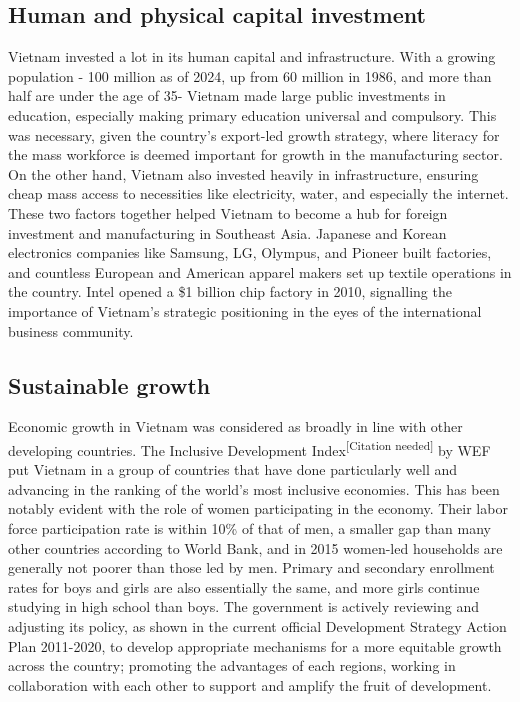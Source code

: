 \documentclass{article}
\begin{document}
\subsection*{Human and physical capital investment}
Vietnam invested a lot in its human capital and infrastructure. With a growing population - 100 million as of 2024, up from 60 million in 1986, and more than half are under the age of 35- Vietnam made large public investments in education, especially making primary education universal and compulsory. This was necessary, given the country's export-led growth strategy, where literacy for the mass workforce is deemed important for growth in the manufacturing sector. On the other hand, Vietnam also invested heavily in infrastructure, ensuring cheap mass access to necessities like electricity, water, and especially the internet. These two factors together helped Vietnam to become a hub for foreign investment and manufacturing in Southeast Asia. Japanese and Korean electronics companies like Samsung, LG, Olympus, and Pioneer built factories, and countless European and American apparel makers set up textile operations in the country. Intel opened a \$1 billion chip factory in 2010, signalling the importance of Vietnam's strategic positioning in the eyes of the international business community.

\subsection*{Sustainable growth}
Economic growth in Vietnam was considered as broadly in line with other developing countries. The Inclusive Development Index\textsuperscript{[Citation needed]} by WEF put Vietnam in a group of countries that have done particularly well and advancing in the ranking of the world's most inclusive economies. This has been notably evident with the role of women participating in the economy. Their labor force participation rate is within 10\% of that of men, a smaller gap than many other countries according to World Bank, and in 2015 women-led households are generally not poorer than those led by men. Primary and secondary enrollment rates for boys and girls are also essentially the same, and more girls continue studying in high school than boys. The government is actively reviewing and adjusting its policy, as shown in the current official Development Strategy Action Plan 2011-2020, to develop appropriate mechanisms for a more equitable growth across the country; promoting the advantages of each regions, working in collaboration with each other to support and amplify the fruit of development.
\end{document}

